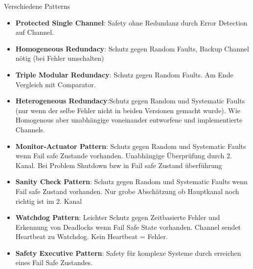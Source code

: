 Verschiedene Patterns
\begin{itemize}
    \item \textbf{Protected Single Channel}: Safety ohne Redundanz durch Error Detection auf Channel.
    \item \textbf{Homogeneous Redundacy}: Schutz gegen Random Faults, Backup Channel nötig (bei Fehler umschalten)
    \item \textbf{Triple Modular Redundacy}: Schutz gegen Random Faults. Am Ende Vergleich mit Comparator.
    \item \textbf{Heterogeneous Redundacy}:Schutz gegen Random und Systematic Faults (nur wenn der selbe Fehler
    nicht in beiden Versionen gemacht wurde). Wie Homogenous aber unabhängige voneinander entworfene
     und implementierte Channels.
    \item \textbf{Monitor-Actuator Pattern}: Schutz gegen Random und Systematic Faults wenn Fail safe
    Zustande vorhanden. Unabhängige Überprüfung durch 2. Kanal. Bei Problem Shutdown bzw in Fail safe
    Zustand überführung
    \item \textbf{Sanity Check Pattern}: Schutz gegen Random und Systematic Faults wenn Fail safe
    Zustand vorhanden. Nur grobe Abschätzung ob Hauptkanal noch richtig ist im 2. Kanal
    \item \textbf{Watchdog Pattern}: Leichter Schutz gegen Zeitbasierte Fehler und Erkennung von Deadlocks
    wenn Fail Safe State vorhanden. Channel sendet Heartbeat zu Watchdog. Kein Heartbeat = Fehler.
    \item \textbf{Safety Executive Pattern}: Safety für komplexe Systeme durch erreichen eines Fail
    Safe Zustandes.
\end{itemize}
